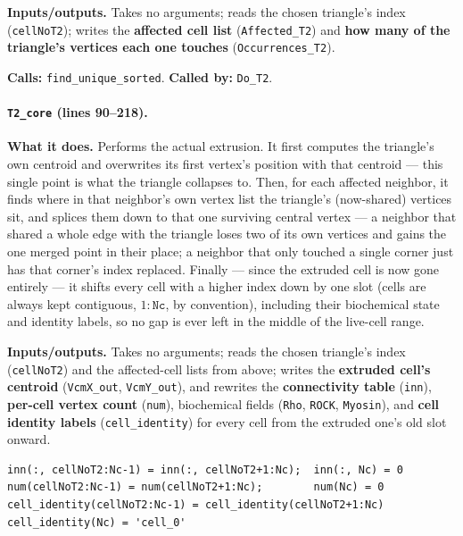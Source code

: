 \documentclass[11pt]{article}
\begin{document}
\textbf{Inputs/outputs.} Takes no arguments; reads the chosen triangle's index
(\texttt{cellNoT2}); writes the \textbf{affected cell list} (\texttt{Affected\_T2}) and
\textbf{how many of the triangle's vertices each one touches}
(\texttt{Occurrences\_T2}).

\textbf{Calls:} \texttt{find\_unique\_sorted}. \textbf{Called by:} \texttt{Do\_T2}.

\paragraph{\texttt{T2\_core} (lines 90--218).}
\textbf{What it does.} Performs the actual extrusion. It first computes the triangle's
own centroid and overwrites its first vertex's position with that centroid --- this
single point is what the triangle collapses to. Then, for each affected neighbor, it
finds where in that neighbor's own vertex list the triangle's (now-shared) vertices
sit, and splices them down to that one surviving central vertex --- a neighbor that
shared a whole edge with the triangle loses two of its own vertices and gains the one
merged point in their place; a neighbor that only touched a single corner just has that
corner's index replaced. Finally --- since the extruded cell is now gone entirely --- it
shifts every cell with a higher index down by one slot (cells are always kept
contiguous, $1{:}\texttt{Nc}$, by convention), including their biochemical state and
identity labels, so no gap is ever left in the middle of the live-cell range.

\textbf{Inputs/outputs.} Takes no arguments; reads the chosen triangle's index
(\texttt{cellNoT2}) and the affected-cell lists from above; writes the \textbf{extruded
cell's centroid} (\texttt{VcmX\_out}, \texttt{VcmY\_out}), and rewrites the
\textbf{connectivity table} (\texttt{inn}), \textbf{per-cell vertex count}
(\texttt{num}), biochemical fields (\texttt{Rho}, \texttt{ROCK}, \texttt{Myosin}), and
\textbf{cell identity labels} (\texttt{cell\_identity}) for every cell from the
extruded one's old slot onward.

\begin{lstlisting}[caption={Closing the gap left by the extruded cell: shifting every later cell's data down by one slot, in \texttt{T2\_core}.}]
inn(:, cellNoT2:Nc-1) = inn(:, cellNoT2+1:Nc);  inn(:, Nc) = 0
num(cellNoT2:Nc-1) = num(cellNoT2+1:Nc);        num(Nc) = 0
cell_identity(cellNoT2:Nc-1) = cell_identity(cellNoT2+1:Nc)
cell_identity(Nc) = 'cell_0'
\end{lstlisting}
\end{document}
